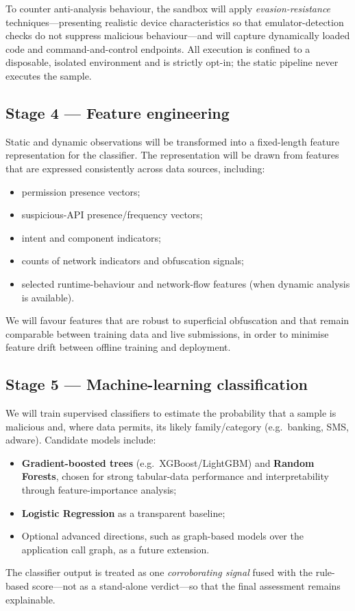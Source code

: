 \documentclass[11pt,a4paper]{article}
\begin{document}
To counter anti-analysis behaviour, the sandbox will apply \emph{evasion-resistance}
techniques---presenting realistic device characteristics so that emulator-detection
checks do not suppress malicious behaviour---and will capture dynamically loaded code and
command-and-control endpoints. All execution is confined to a disposable, isolated
environment and is strictly opt-in; the static pipeline never executes the sample.

\subsection{Stage 4 --- Feature engineering}
Static and dynamic observations will be transformed into a fixed-length feature
representation for the classifier. The representation will be drawn from features that
are expressed consistently across data sources, including:
\begin{itemize}
  \item permission presence vectors;
  \item suspicious-API presence/frequency vectors;
  \item intent and component indicators;
  \item counts of network indicators and obfuscation signals;
  \item selected runtime-behaviour and network-flow features (when dynamic analysis is
  available).
\end{itemize}
We will favour features that are robust to superficial obfuscation and that remain
comparable between training data and live submissions, in order to minimise feature
drift between offline training and deployment.

\subsection{Stage 5 --- Machine-learning classification}
We will train supervised classifiers to estimate the probability that a sample is
malicious and, where data permits, its likely family/category (e.g.\ banking, SMS,
adware). Candidate models include:
\begin{itemize}
  \item \textbf{Gradient-boosted trees} (e.g.\ XGBoost/LightGBM) and \textbf{Random
  Forests}, chosen for strong tabular-data performance and interpretability through
  feature-importance analysis;
  \item \textbf{Logistic Regression} as a transparent baseline;
  \item Optional advanced directions, such as graph-based models over the application
  call graph, as a future extension.
\end{itemize}
The classifier output is treated as one \emph{corroborating signal} fused with the
rule-based score---not as a stand-alone verdict---so that the final assessment remains
explainable.
\end{document}
